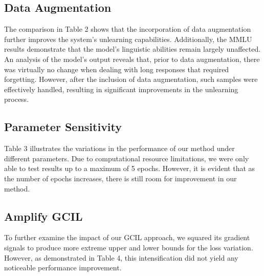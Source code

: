 \documentclass[11pt]{article}
\begin{document}
\subsection{Data Augmentation} 

The comparison in Table 2 shows that the incorporation of data augmentation further improves the system's unlearning capabilities. Additionally, the MMLU results demonstrate that the model’s linguistic abilities remain largely unaffected. An analysis of the model's output reveals that, prior to data augmentation, there was virtually no change when dealing with long responses that required forgetting. However, after the inclusion of data augmentation, such samples were effectively handled, resulting in significant improvements in the unlearning process.





\subsection{Parameter Sensitivity}  

Table 3 illustrates the variations in the performance of our method under different parameters. Due to computational resource limitations, we were only able to test results up to a maximum of 5 epochs. However, it is evident that as the number of epochs increases, there is still room for improvement in our method.





\subsection{Amplify GCIL} 
To further examine the impact of our GCIL approach, we squared its gradient signals to produce more extreme upper and lower bounds for the loss variation. However, as demonstrated in Table 4, this intensification did not yield any noticeable performance improvement.
\end{document}
